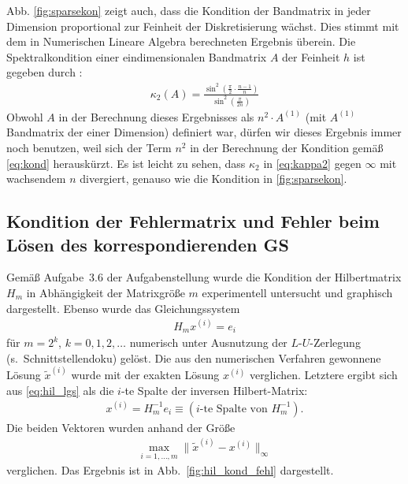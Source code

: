 \documentclass[smallheadings]{scrartcl}
\numberwithin{equation}{section}
\begin{document}
Abb. \ref{fig:sparsekon} zeigt auch, dass die Kondition der Bandmatrix in jeder Dimension proportional zur Feinheit der Diskretisierung wächst. Dies stimmt mit dem in Numerischen Lineare Algebra berechneten Ergebnis überein. Die Spektralkondition einer eindimensionalen Bandmatrix $A$ der Feinheit $h$ ist gegeben durch \cite{aufg6.2}:
\begin{align}
\kappa_2(A) = \frac{\sin^2(\frac{\pi}{2}\cdot\frac{n-1}{n})}{\sin^2(\frac{\pi}{2n})}
\label{eq:kappa2}
\end{align}
Obwohl $A$ in der Berechnung dieses Ergebnisses als $n^2\cdot A^{(1)}$ (mit $A^{(1)}$ Bandmatrix der einer Dimension) definiert war, dürfen wir dieses Ergebnis immer noch benutzen, weil sich der Term $n^2$ in der Berechnung der Kondition gemäß \ref{eq:kond} herauskürzt. Es ist leicht zu sehen, dass $\kappa_2$ in \ref{eq:kappa2} gegen $\infty$ mit wachsendem $n$ divergiert, genauso wie die Kondition in \ref{fig:sparsekon}.

%

\subsection{Kondition der Fehlermatrix und Fehler beim Lösen des korrespondierenden GS}

Gemäß Aufgabe~3.6 der Aufgabenstellung wurde die Kondition der Hilbertmatrix $H_m$ in Abhängigkeit der Matrixgröße $m$ experimentell untersucht und graphisch dargestellt. Ebenso wurde das Gleichungssystem 
\begin{align}
H_mx^{(i)}=e_i
\label{eq:hil_lgs}
\end{align}
für $m=2^k$, $k=0,1,2,\dots$ numerisch unter Ausnutzung der $L$-$U$-Zerlegung (s.~Schnittstellendoku) gelöst. Die aus den numerischen Verfahren gewonnene Lösung $\tilde{x}^{(i)}$ wurde mit der exakten Lösung $x^{(i)}$ verglichen. Letztere ergibt sich aus \eqref{eq:hil_lgs} als die $i$-te Spalte der inversen Hilbert-Matrix:
\begin{align}
x^{(i)}=H_m^{-1}e_i\equiv(\text{$i$-te Spalte von }H_m^{-1}).
\end{align}
Die beiden Vektoren wurden anhand der Größe
\begin{align*}
\max\limits_{i=1,\dots,m}\|\tilde{x}^{(i)}-x^{(i)}\|_\infty
\end{align*}
verglichen. Das Ergebnis ist in Abb.~\ref{fig:hil_kond_fehl}
dargestellt.
\end{document}
